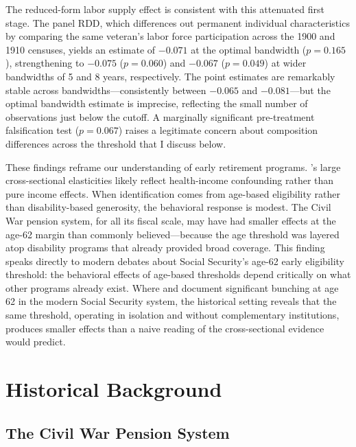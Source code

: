 \documentclass[12pt]{article}
\begin{document}
The reduced-form labor supply effect is consistent with this attenuated first stage. The panel RDD, which differences out permanent individual characteristics by comparing the same veteran's labor force participation across the 1900 and 1910 censuses, yields an estimate of $-0.071$ at the optimal bandwidth ($p = 0.165$), strengthening to $-0.075$ ($p = 0.060$) and $-0.067$ ($p = 0.049$) at wider bandwidths of 5 and 8 years, respectively. The point estimates are remarkably stable across bandwidths---consistently between $-0.065$ and $-0.081$---but the optimal bandwidth estimate is imprecise, reflecting the small number of observations just below the cutoff. A marginally significant pre-treatment falsification test ($p = 0.067$) raises a legitimate concern about composition differences across the threshold that I discuss below.

These findings reframe our understanding of early retirement programs. \citeauthor{costa1995pensions}'s large cross-sectional elasticities likely reflect health-income confounding rather than pure income effects. When identification comes from age-based eligibility rather than disability-based generosity, the behavioral response is modest. The Civil War pension system, for all its fiscal scale, may have had smaller effects at the age-62 margin than commonly believed---because the age threshold was layered atop disability programs that already provided broad coverage. This finding speaks directly to modern debates about Social Security's age-62 early eligibility threshold: the behavioral effects of age-based thresholds depend critically on what other programs already exist. Where \citet{fetter2018} and \citet{behaghel2012} document significant bunching at age 62 in the modern Social Security system, the historical setting reveals that the same threshold, operating in isolation and without complementary institutions, produces smaller effects than a naive reading of the cross-sectional evidence would predict.


\section{Historical Background}

\subsection{The Civil War Pension System}
\end{document}
